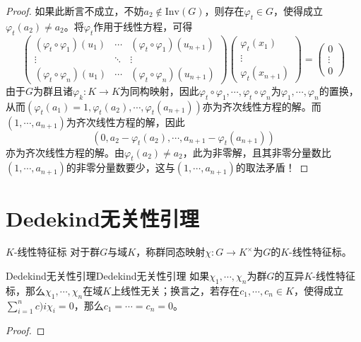 \documentclass[lang = cn, scheme = chinese, thmcnt = section, usesamecnt]{elegantbook}
\newcommand{\dis}{\displaystyle}
\newcommand{\Inv}{\mathrm{Inv}}
\begin{document}
\begin{proof}
	如果此断言不成立，不妨$a_2\notin \Inv(G)$，则存在$\varphi_t\in G$，使得成立$\varphi_t(a_2)\ne a_2$。将$\varphi_t$作用于线性方程，可得
	$$
	\begin{pmatrix}
		(\varphi_t\circ\varphi_1)(u_1) & \cdots & (\varphi_t\circ\varphi_1)(u_{n+1}) \\
		\vdots & \ddots & \vdots \\
		(\varphi_t\circ\varphi_n)(u_1) & \cdots & (\varphi_t\circ\varphi_n)(u_{n+1})
	\end{pmatrix}
	\begin{pmatrix}
		\varphi_t(x_1) \\
		\vdots \\
		\varphi_t(x_{n+1})
	\end{pmatrix}
	=\begin{pmatrix}
		0 \\
		\vdots \\
		0
	\end{pmatrix}
	$$
	由于$G$为群且诸$\varphi_k:K\to K$为同构映射，因此$\varphi_t\circ\varphi_1,\cdots,\varphi_t\circ\varphi_n$为$\varphi_1,\cdots,\varphi_n$的置换，从而$(\varphi_t(a_1)=1,\varphi_t(a_2),\cdots,\varphi_t(a_{n+1}))$亦为齐次线性方程的解。而$(1,\cdots,a_{n+1})$为齐次线性方程的解，因此%
	$$
	(0,a_2-\varphi_t(a_2),\cdots,a_{n+1}-\varphi_t(a_{n+1}))
	$$
	亦为齐次线性方程的解。由$\varphi_t(a_2)\ne a_2$，此为非零解，且其非零分量数比$(1,\cdots,a_{n+1})$的非零分量数要少，这与$(1,\cdots,a_{n+1})$的取法矛盾！
\end{proof}

\section{Dedekind无关性引理}

\begin{definition}{$K$-线性特征标}
	对于群$G$与域$K$，称群同态映射$\chi:G\to K^\times$为$G$的$K$-线性特征标。
\end{definition}

\begin{lemma}{Dedekind无关性引理}{Dedekind无关性引理}
	如果$\chi_1,\cdots,\chi_n$为群$G$的互异$K$-线性特征标，那么$\chi_1,\cdots,\chi_n$在域$K$上线性无关；换言之，若存在$c_1,\cdots,c_n\in K$，使得成立$\dis\sum_{i=1}^{n}c)i\chi_i=0$，那么$c_1=\cdots=c_n=0$。
\end{lemma}

\begin{proof}
	
\end{proof}
\end{document}
